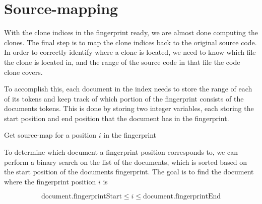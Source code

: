 \section{Source-mapping}

With the clone indices in the fingerprint ready, we are almost done computing the clones.
The final step is to map the clone indices back to the original source code. In order to
correctly identify where a clone is located, we need to know which file the clone is
located in, and the range of the source code in that file the code clone covers.

To accomplish this, each document in the index needs to store the range of each of its
tokens and keep track of which portion of the fingerprint consists of the documents
tokens. This is done by storing two integer variables, each storing the start position and
end position that the document has in the fingerprint. 

\begin{algorithm}[htp!]
  \SetAlgoLined\DontPrintSemicolon

  \vspace{0.5cm}
  \caption{Get source-map for a position $i$ in the fingerprint}
  \label{alg:sourcemap}
\end{algorithm}

To determine which document a fingerprint position corresponds to, we can perform a binary
search on the list of the documents, which is sorted based on the start position of the
documents fingerprint. The goal is to find the document where the fingerprint position $i$
is 

$$
\text{document.fingerprintStart} \leq i \leq \text{document.fingerprintEnd}
$$

